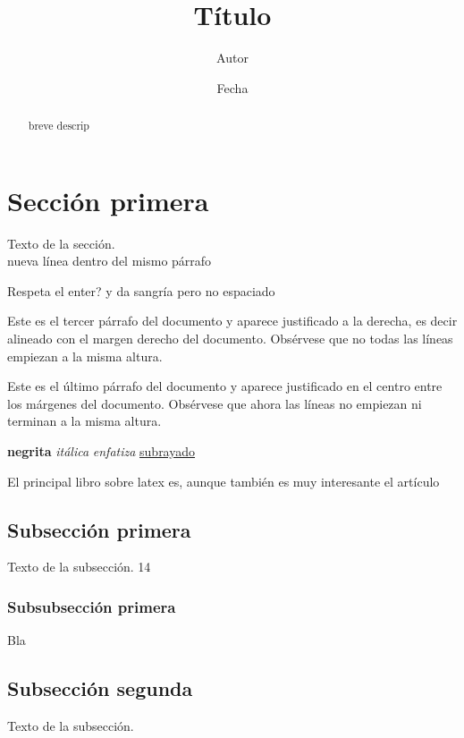 \documentclass[a4paper, 10pt]{article}
\title{Título}
\author{Autor}
\date{Fecha}
\begin{document}
    \maketitle %

    \begin{abstract}
    breve descrip
    \end{abstract}


    \tableofcontents %

    \section{Sección primera}
    Texto de la sección.
    \\ nueva línea dentro del mismo párrafo

    Respeta el enter? y da sangría pero no espaciado

    \begin{flushright}
    Este es el tercer párrafo del documento y aparece justificado a la derecha, es decir alineado con el margen derecho del documento. Obsérvese que no todas las líneas empiezan a la misma altura.
    \end{flushright}
    \begin{center}
    Este es el último párrafo del documento y aparece justificado en el centro entre los márgenes del documento. Obsérvese que ahora las líneas no empiezan ni terminan a la misma altura.
    \end{center}

    \textbf{negrita}
    \textit{itálica}
    \emph{enfatiza}
    \underline{subrayado}


    El principal libro sobre latex es, aunque también
    es muy interesante el artículo \cite{borbonlatex2022}

    \subsection{Subsección primera}
    Texto de la subsección.
    14

    \subsubsection{Subsubsección primera}
    Bla


    \subsection*{Subsección segunda}
    Texto de la subsección.


%
%
\nocite{*}
\printbibliography
\end{document}
